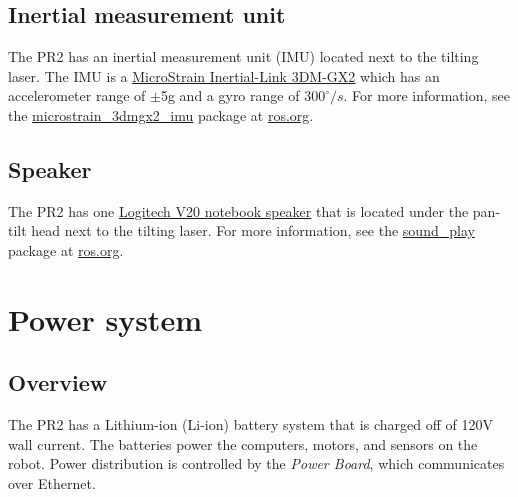 \subsection{Inertial measurement unit}
The PR2 has an inertial measurement unit (IMU) located next to the tilting laser. The IMU is a 
\href{http://www.microstrain.com/3dm-gx2.aspx}{MicroStrain Inertial-Link 3DM-GX2} which has an 
accelerometer range of $\pm$5g and a gyro range of $300^\circ/s$. For more information, see 
the \href{http://www.ros.org/wiki/microstrain_3dmgx2_imu}{microstrain\_3dmgx2\_imu} package 
at \href{http://www.ros.org}{ros.org}.

\subsection{Speaker}
The PR2 has one \href{http://www.logitech.com/index.cfm/speakers_audio/home_pc_speakers/devices/199&cl=us,en}{Logitech V20 notebook speaker} 
that is located under the pan-tilt head next to the tilting laser. For more information, 
see the \href{http://www.ros.org/wiki/sound_play}{sound\_play} package at \href{http://www.ros.org}{ros.org}.

\section{Power system}
\subsection{Overview}
The PR2 has a Lithium-ion (Li-ion) battery system that is charged off of 120V wall current. The batteries power the computers, motors, and sensors on the robot.  Power distribution is controlled by the \emph{Power Board}, which communicates over Ethernet.
